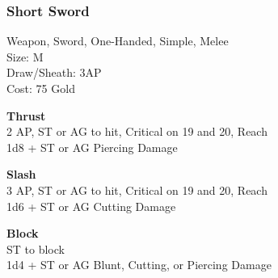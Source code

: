 \subsubsection{Short Sword}\label{weapon:shortSword}
Weapon, Sword, One-Handed, Simple, Melee\\
Size: M\\
Draw/Sheath: 3AP\\
Cost: 75 Gold

\textbf{Thrust}\\
2 AP, ST or AG to hit, Critical on 19 and 20,  Reach\\
1d8 + \texttimes ST or AG Piercing Damage

\textbf{Slash}\\
3 AP, ST or AG to hit, Critical on 19 and 20,  Reach\\
1d6 + \texttimes ST or AG Cutting Damage

\textbf{Block}\\
ST to block\\
1d4 + \texttimes ST or AG Blunt, Cutting, or Piercing Damage

